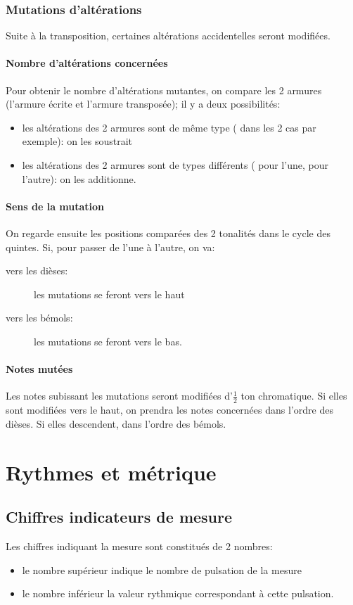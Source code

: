 \documentclass[11pt,a4paper]{scrreprt}
\begin{document}
\subsection{Mutations d'altérations}
Suite à la transposition, certaines altérations accidentelles seront modifiées.
\subsubsection{Nombre d'altérations concernées}
Pour obtenir le nombre d'altérations mutantes, on compare les 2 armures (l'armure écrite et l'armure transposée); il y a deux possibilités:
\begin{itemize}
\item les altérations des 2 armures sont de même type (\fetaflat{} dans les 2 cas par exemple): on les soustrait
\item les altérations des 2 armures sont de types différents (\fetaflat{} pour l'une, \fetasharp{} pour l'autre): on les additionne.
\end{itemize}
\subsubsection{Sens de la mutation}
On regarde ensuite les positions comparées des 2 tonalités dans le cycle des quintes. Si, pour passer de l'une à l'autre, on va: 
\begin{description}
\item [vers les dièses:] les mutations se feront vers le haut
\item [vers les bémols:] les mutations se feront vers le bas.
\end{description}
\subsubsection{Notes mutées}
Les notes subissant les mutations seront modifiées d'$\frac12$ ton chromatique. Si elles sont modifiées vers le haut, on prendra les notes concernées dans l'ordre des dièses. Si elles descendent, dans l'ordre des bémols.

\chapter{Rythmes et métrique}
\section{Chiffres indicateurs de mesure}
Les chiffres indiquant la mesure sont constitués de 2 nombres:
\begin{itemize}
\item le nombre supérieur indique le nombre de pulsation de la mesure
\item le nombre inférieur la valeur rythmique correspondant à cette pulsation.
\end{itemize}
\end{document}
